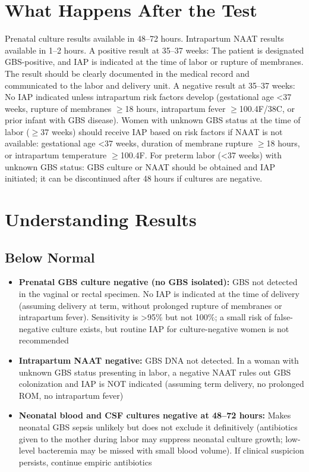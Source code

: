 \section*{What Happens After the Test}
Prenatal culture results available in 48--72 hours. Intrapartum NAAT results available in 1--2 hours. A positive result at 35--37 weeks: The patient is designated GBS-positive, and IAP is indicated at the time of labor or rupture of membranes. The result should be clearly documented in the medical record and communicated to the labor and delivery unit. A negative result at 35--37 weeks: No IAP indicated unless intrapartum risk factors develop (gestational age <37 weeks, rupture of membranes $\geq$18 hours, intrapartum fever $\geq$100.4\textdegree{}F/38\textdegree{}C, or prior infant with GBS disease). Women with unknown GBS status at the time of labor ($\geq$37 weeks) should receive IAP based on risk factors if NAAT is not available: gestational age <37 weeks, duration of membrane rupture $\geq$18 hours, or intrapartum temperature $\geq$100.4\textdegree{}F. For preterm labor (<37 weeks) with unknown GBS status: GBS culture or NAAT should be obtained and IAP initiated; it can be discontinued after 48 hours if cultures are negative.

\section*{Understanding Results}

\subsection*{Below Normal}
\begin{itemize}
  \item \textbf{Prenatal GBS culture negative (no GBS isolated):} GBS not detected in the vaginal or rectal specimen. No IAP is indicated at the time of delivery (assuming delivery at term, without prolonged rupture of membranes or intrapartum fever). Sensitivity is >95\% but not 100\%; a small risk of false-negative culture exists, but routine IAP for culture-negative women is not recommended
  \item \textbf{Intrapartum NAAT negative:} GBS DNA not detected. In a woman with unknown GBS status presenting in labor, a negative NAAT rules out GBS colonization and IAP is NOT indicated (assuming term delivery, no prolonged ROM, no intrapartum fever)
  \item \textbf{Neonatal blood and CSF cultures negative at 48--72 hours:} Makes neonatal GBS sepsis unlikely but does not exclude it definitively (antibiotics given to the mother during labor may suppress neonatal culture growth; low-level bacteremia may be missed with small blood volume). If clinical suspicion persists, continue empiric antibiotics
\end{itemize}

